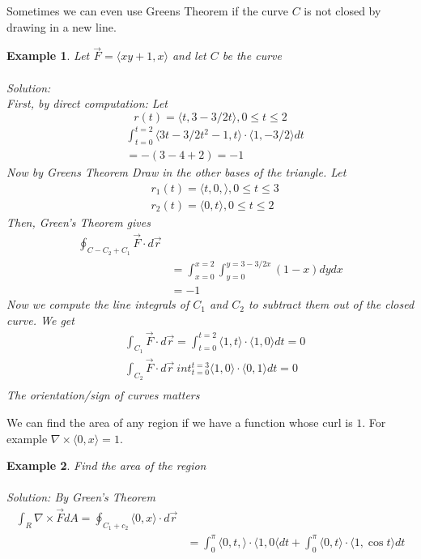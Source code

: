 \documentclass[11pt]{article}
\newtheorem{ex}{Example}
\begin{document}
Sometimes we can even use Greens Theorem if the curve $C$ is not closed by drawing in a new line.
\begin{ex}
  Let $\vec{F} = \langle xy + 1, x \rangle$ and let $C$ be the curve \\
  \\
  Solution: \\
  First, by direct computation:
  Let
  \[r(t) = \langle t, 3- 3/2 t\rangle, 0 \le t \le 2\]
  \begin{align*}
    &\int_{t=0}^{t = 2} \langle 3t - 3/2 t^{2} - 1, t\rangle \cdot \langle 1, -3/2 \rangle dt \\
    &= -(3-4+2) = -1
  \end{align*}
  Now by Greens Theorem
  Draw in the other bases of the triangle.
  Let
  \begin{align*}
    &r_{1}(t) = \langle t, 0, \rangle , 0 \le t \le 3 \\
    &r_{2}(t) = \langle 0, t \rangle, 0 \le t \le 2
  \end{align*}
  Then, Green's Theorem gives
  \begin{align*}
    \oint_{C - C_{2} + C_{1}} \vec{F} \cdot d\vec{r} \\
    &= \int_{x=0}^{x=2} \int_{y=0}^{y=3-3/2x} (1-x) dy dx \\
    &= -1
  \end{align*}
  Now we compute the line integrals of $C_{1}$ and $C_{2}$ to subtract them out of the closed curve. We get
  \begin{align*}
    &\int_{C_{1}} \vec{F} \cdot d \vec{r} = \int_{t=0}^{t=2} \langle 1, t \rangle \cdot \langle 1, 0 \rangle dt = 0 \\
    &\int_{C_{2}} \vec{F} \cdot d \vec{r} \ int_{t=0}^{t=3} \langle 1, 0 \rangle \cdot \langle 0, 1 \rangle dt   = 0 \\
  \end{align*}
  The orientation/sign of curves matters
\end{ex}

We can find the area of any region if we have a function whose curl is $1$. For example
$\nabla \times \langle 0, x \rangle = 1$.
\begin{ex}
  Find the area of the region\\
   \\
  Solution:
  By Green's Theorem
  \begin{align*}
    \int_{R} \nabla \times \vec{F} dA = \oint_{C_{1}+c_{2}} \langle 0, x \rangle \cdot d \vec{r}\\
    &= \int_{0}^{\pi} \langle 0, t, \rangle \cdot \langle 1, 0 \langle dt + \int_{0}^{\pi} \langle 0, t \rangle \cdot \langle 1 , \cos t \rangle dt
  \end{align*}
\end{ex}
\end{document}
